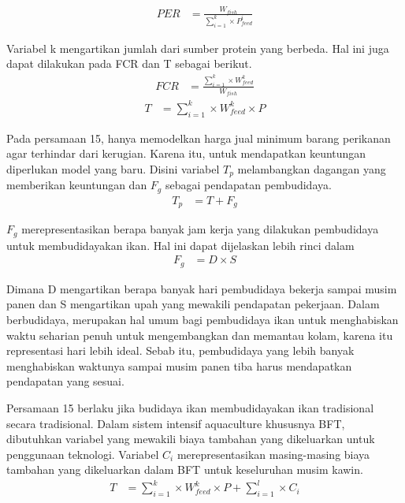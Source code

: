 \begin{equation}
    \begin{split}
		PER
		&= \frac{W_{fish}}{\sum_{i=1}^k \times P^i_{feed}}
    \end{split}
\end{equation}

Variabel k mengartikan jumlah dari sumber protein yang berbeda. Hal ini juga dapat dilakukan pada FCR dan T sebagai berikut.
\begin{equation}
    \begin{split}
		FCR
		&= \frac{\sum_{i=1}^k \times W^k_{feed}}{W_{fish}}
    \end{split}
\end{equation}
\begin{equation}
    \begin{split}
		T
		&= \sum_{i=1}^k \times W^k_{feed} \times P
    \end{split}
\end{equation}

Pada persamaan 15, hanya memodelkan harga jual minimum barang perikanan agar terhindar dari kerugian. Karena itu, untuk mendapatkan keuntungan diperlukan model yang baru. Disini variabel $T_p$ melambangkan dagangan yang memberikan keuntungan dan $F_g$ sebagai pendapatan pembudidaya.
\begin{equation}
    \begin{split}
		T_p
		&= T + F_g
    \end{split}
\end{equation}

$F_g$ merepresentasikan berapa banyak jam kerja yang dilakukan pembudidaya untuk membudidayakan ikan. Hal ini dapat dijelaskan lebih rinci dalam
\begin{equation}
    \begin{split}
		F_g
		&= D \times S
    \end{split}
\end{equation}

Dimana D mengartikan berapa banyak hari pembudidaya bekerja sampai musim panen dan S mengartikan upah yang mewakili pendapatan pekerjaan. Dalam berbudidaya, merupakan hal umum bagi pembudidaya ikan untuk menghabiskan waktu seharian penuh untuk mengembangkan dan memantau kolam, karena itu representasi hari lebih ideal. Sebab itu, pembudidaya yang lebih banyak menghabiskan waktunya sampai musim panen tiba harus mendapatkan pendapatan yang sesuai.

Persamaan 15 berlaku jika budidaya ikan membudidayakan ikan tradisional secara tradisional. Dalam sistem intensif aquaculture khususnya BFT, dibutuhkan variabel yang mewakili biaya tambahan yang dikeluarkan untuk penggunaan teknologi. Variabel ${C_i}$ merepresentasikan masing-masing biaya tambahan yang dikeluarkan dalam BFT untuk keseluruhan musim kawin.
\begin{equation}
    \begin{split}
		T
		&= \sum_{i=1}^k \times W^k_{feed} \times P + \sum_{i=1}^l \times C_i
    \end{split}
\end{equation}

